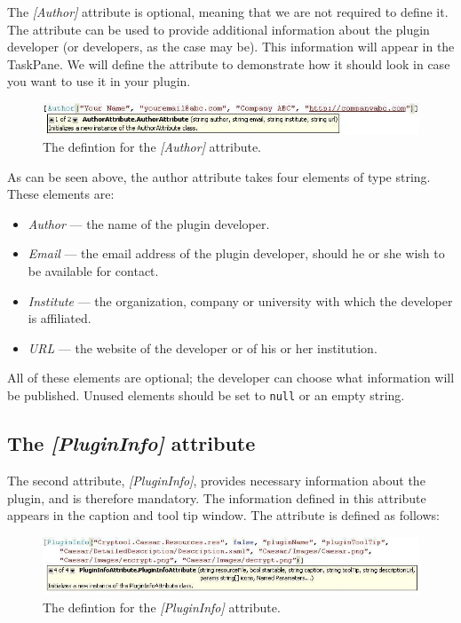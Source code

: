 The \textit{[Author]} attribute is optional, meaning that we are not required to define it. The attribute can be used to provide additional information about the plugin developer (or developers, as the case may be). This information will appear in the TaskPane. We will define the attribute to demonstrate how it should look in case you want to use it in your plugin.

\begin{figure}[h!]
	\centering
		\includegraphics[width=.90\textwidth]{figures/attribute_author.jpg}
	\caption{The defintion for the \textit{[Author]} attribute.}
	\label{fig:attribute_author}
\end{figure}

As can be seen above, the author attribute takes four elements of type string. These elements are:

\begin{itemize}
	\item \textit{Author} --- the name of the plugin developer.
	\item \textit{Email} --- the email address of the plugin developer, should he or she wish to be available for contact.
	\item \textit{Institute} --- the organization, company or university with which the developer is affiliated.
	\item \textit{URL} --- the website of the developer or of his or her institution.
\end{itemize}

All of these elements are optional; the developer can choose what information will be published. Unused elements should be set to \texttt{null} or an empty string.

\subsection{The \protect\textit{[PluginInfo]} attribute}
\label{sec:ThePluginInfoAttribute}

The second attribute, \textit{[PluginInfo]}, provides necessary information about the plugin, and is therefore mandatory. The information defined in this attribute appears in the caption and tool tip window. The attribute is defined as follows:

\begin{figure}[h]
	\centering
		\includegraphics[width=1.00\textwidth]{figures/attribute_plugininfo.jpg}
	\caption{The defintion for the \textit{[PluginInfo]} attribute.}
	\label{fig:attribute_plugininfo}
\end{figure}

